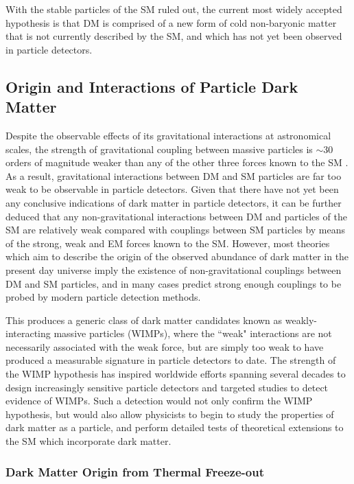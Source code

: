 With the stable particles of the SM ruled out, the current most widely accepted hypothesis is that DM is comprised of a new form of cold non-baryonic matter that is not currently described by the SM, and which has not yet been observed in particle detectors.

\subsection{Origin and Interactions of Particle Dark Matter}

Despite the observable effects of its gravitational interactions at astronomical scales, the strength of gravitational coupling between massive particles is \(\sim30\) orders of magnitude weaker than any of the other three forces known to the SM \cite{griffiths_2008}. As a result, gravitational interactions between DM and SM particles are far too weak to be observable in particle detectors. Given that there have not yet been any conclusive indications of dark matter in particle detectors, it can be further deduced that any non-gravitational interactions between DM and particles of the SM are relatively weak compared with couplings between SM particles by means of the strong, weak and EM forces known to the SM. However, most theories which aim to describe the origin of the observed abundance of dark matter in the present day universe imply the existence of non-gravitational couplings between DM and SM particles, and in many cases predict strong enough couplings to be probed by modern particle detection methods. 

This produces a generic class of dark matter candidates known as weakly-interacting massive particles (WIMPs), where the ``weak" interactions are not necessarily associated with the weak force, but are simply too weak to have produced a measurable signature in particle detectors to date. The strength of the WIMP hypothesis has inspired worldwide efforts spanning several decades to design increasingly sensitive particle detectors and targeted studies to detect evidence of WIMPs. Such a detection would not only confirm the WIMP hypothesis, but would also allow physicists to begin to study the properties of dark matter as a particle, and perform detailed tests of theoretical extensions to the SM which incorporate dark matter.

\subsubsection{Dark Matter Origin from Thermal Freeze-out}

